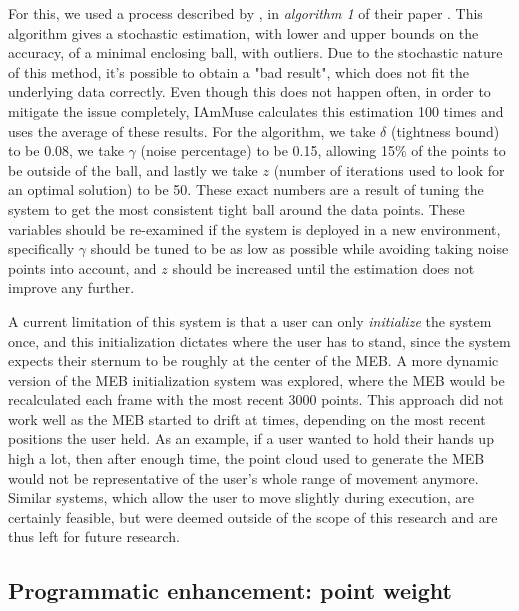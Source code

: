 For this, we used a process described by \citeauthor{ding2020sublinear}, in \textit{algorithm 1} of their paper \cite{ding2020sublinear}.
This algorithm gives a stochastic estimation, with lower and upper bounds on the accuracy, of a minimal enclosing ball, with outliers.
Due to the stochastic nature of this method, it's possible to obtain a "bad result", which does not fit the underlying data correctly.
Even though this does not happen often, in order to mitigate the issue completely, IAmMuse calculates this estimation 100 times and uses the average of these results.
For the algorithm, we take $\delta$ (tightness bound) to be 0.08, we take $\gamma$ (noise percentage) to be 0.15, allowing 15\% of the points to be outside of the ball, and lastly we take $z$ (number of iterations used to look for an optimal solution) to be 50.
These exact numbers are a result of tuning the system to get the most consistent tight ball around the data points.
These variables should be re-examined if the system is deployed in a new environment, specifically $\gamma$ should be tuned to be as low as possible while avoiding taking noise points into account, and $z$ should be increased until the estimation does not improve any further.

A current limitation of this system is that a user can only \textit{initialize} the system once, and this initialization dictates where the user has to stand, since the system expects their sternum to be roughly at the center of the MEB.
A more dynamic version of the MEB initialization system was explored, where the MEB would be recalculated each frame with the most recent 3000 points.
This approach did not work well as the MEB started to drift at times, depending on the most recent positions the user held.
As an example, if a user wanted to hold their hands up high a lot, then after enough time, the point cloud used to generate the MEB would not be representative of the user's whole range of movement anymore.
Similar systems, which allow the user to move slightly during execution, are certainly feasible, but were deemed outside of the scope of this research and are thus left for future research.


\subsection{Programmatic enhancement: point weight}
\label{sub-section: tracking method - data enhancement - point weight}

